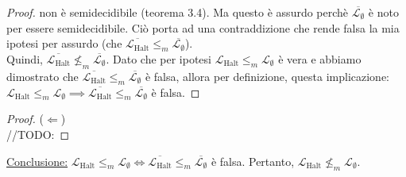 \documentclass{article}  %
\theoremstyle{definition}
\begin{document}
\begin{esercizio}[Esempio 3.5]
\begin{proof}
		non è semidecidibile (teorema 3.4). Ma questo è assurdo perchè $\overline{\mathcal{L}_{\emptyset}}$ è noto per essere semidecidibile. Ciò porta ad una contraddizione che rende falsa la mia
		ipotesi per assurdo (che $\overline{\mathcal{L}_{\text{Halt}}} \leq_m \overline{\mathcal{L}_{\emptyset}}$). \\ Quindi, $\overline{\mathcal{L}_{\text{Halt}}} \nleq_m \overline{\mathcal{L}_{\emptyset}}$.
		Dato che per ipotesi $\mathcal{L}_{\text{Halt}} \leq_m \mathcal{L}_{\emptyset}$ è vera e abbiamo dimostrato che $\overline{\mathcal{L}_{\text{Halt}}} \leq_m \overline{\mathcal{L}_{\emptyset}}$
		è falsa, allora per definizione, questa implicazione: \\ $\mathcal{L}_{\text{Halt}} \leq_m \mathcal{L}_{\emptyset} \implies \overline{\mathcal{L}_{\text{Halt}}} \leq_m \overline{\mathcal{L}_{\emptyset}}$ è falsa.
	\end{proof}

	\begin{proof}
		($\Longleftarrow$) \\
		//TODO:
	\end{proof}
	\underline{Conclusione:} $\mathcal{L}_{\text{Halt}} \leq_m \mathcal{L}_{\emptyset} \iff \overline{\mathcal{L}_{\text{Halt}}}
		\leq_m \overline{\mathcal{L}_{\emptyset}}$ è falsa. Pertanto, $\mathcal{L}_{\text{Halt}} \nleq_m \mathcal{L}_{\emptyset}$.
\end{esercizio}
\break
\end{document}
